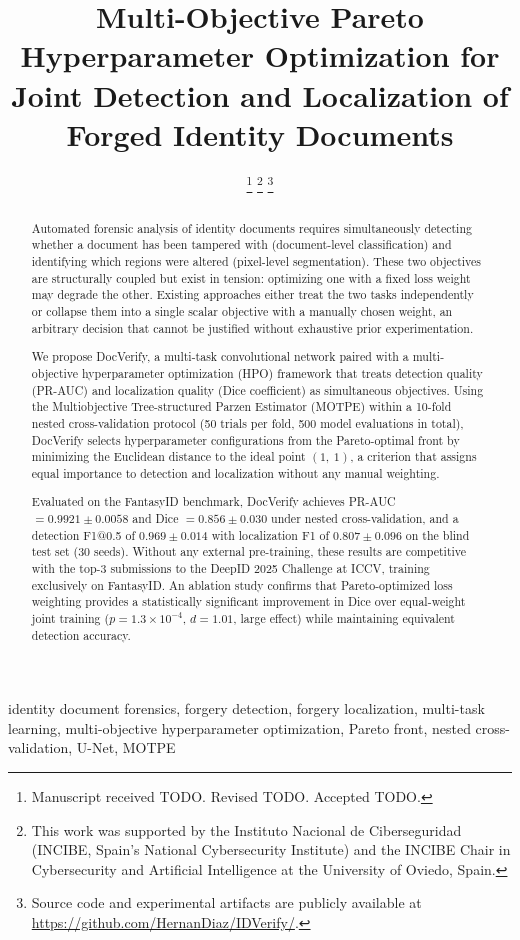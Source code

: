 \documentclass[journal]{IEEEtran}
\title{Multi-Objective Pareto Hyperparameter Optimization for Joint Detection and
       Localization of Forged Identity Documents}
\author{%
  \IEEEauthorblockN{Hern\'{a}n D\'{i}az Rodr\'{i}guez}
  \IEEEauthorblockA{Department of Computer Science\\
    University of Oviedo, Asturias, Spain\\
    Email: diazhernan@uniovi.es}
  \thanks{Manuscript received TODO. Revised TODO. Accepted TODO.}%
  \thanks{This work was supported by the Instituto Nacional de Ciberseguridad
    (INCIBE, Spain's National Cybersecurity Institute) and the INCIBE Chair
    in Cybersecurity and Artificial Intelligence at the University of Oviedo, Spain.}%
  \thanks{Source code and experimental artifacts are publicly available at
    \url{https://github.com/HernanDiaz/IDVerify/}.}%
}
\begin{document}
\maketitle

\begin{abstract}
Automated forensic analysis of identity documents requires simultaneously
detecting whether a document has been tampered with (document-level classification)
and identifying which regions were altered (pixel-level segmentation). These two
objectives are structurally coupled but exist in tension: optimizing one with a
fixed loss weight may degrade the other. Existing approaches either treat the two
tasks independently or collapse them into a single scalar objective with a
manually chosen weight, an arbitrary decision that cannot be justified without
exhaustive prior experimentation.

We propose DocVerify, a multi-task convolutional network paired with a
multi-objective hyperparameter optimization (HPO) framework that treats
detection quality (PR-AUC) and localization quality (Dice coefficient) as
simultaneous objectives. Using the Multiobjective Tree-structured Parzen Estimator
(MOTPE) within a 10-fold nested cross-validation protocol (50 trials per fold,
500 model evaluations in total), DocVerify selects hyperparameter configurations
from the Pareto-optimal front by minimizing the Euclidean distance to the ideal
point $(1,~1)$, a criterion that assigns equal importance to detection and
localization without any manual weighting.

Evaluated on the FantasyID benchmark, DocVerify achieves PR-AUC $= 0.9921 \pm
0.0058$ and Dice $= 0.856 \pm 0.030$ under nested cross-validation, and a
detection F1@0.5 of $0.969 \pm 0.014$ with localization F1 of $0.807 \pm 0.096$
on the blind test set (30 seeds). Without any external pre-training, these results
are competitive with the top-3 submissions to the DeepID 2025 Challenge at ICCV,
training exclusively on FantasyID. An ablation study confirms that
Pareto-optimized loss weighting provides a statistically significant improvement
in Dice over equal-weight joint training ($p = 1.3 \times 10^{-4}$,
$d = 1.01$, large effect) while maintaining equivalent detection accuracy.
\end{abstract}

\begin{IEEEkeywords}
identity document forensics, forgery detection, forgery localization, multi-task
learning, multi-objective hyperparameter optimization, Pareto front, nested
cross-validation, U-Net, MOTPE
\end{IEEEkeywords}
\end{document}
